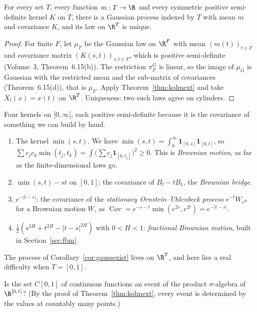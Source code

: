 \begin{corollary}\label{cor:gaussexist}
For every set $T$, every function $m:T\to\R$ and every symmetric positive semi-definite kernel $K$ on $T$, there is a Gaussian process indexed by $T$ with mean $m$ and covariance $K$, and its
law on $\R^T$ is unique.
\end{corollary}

\begin{proof}
For finite $F$, let $\mu_F$ be the Gaussian law on $\R^F$ with mean $(m(t))_{t\in F}$ and covariance matrix $(K(s,t))_{s,t\in F}$, which is positive semi-definite (Volume~3, Theorem~6.15(b)). The restriction
$\pi^G_F$ is linear, so the image of $\mu_G$ is Gaussian with the restricted mean and the sub-matrix of covariances (Theorem~6.15(d)), that is $\mu_F$. Apply Theorem~\ref{thm:kolmext} and take $X_t(x)=x(t)$ on
$\R^T$. Uniqueness: two such laws agree on cylinders.
\end{proof}

\begin{example}\label{ex:kernels}
Four kernels on $[0,\infty[$, each positive semi-definite because it is the covariance of something we can build by hand.
\begin{enumerate}[label=(\alph*)]
\item The kernel $\min(s,t)$. We have $\min(s,t)=\int_0^\infty\mathbf 1_{[0,s]}\mathbf 1_{[0,t]}$, so $\sum c_jc_k\min(t_j,t_k)=\int\bigl(\sum c_j\mathbf 1_{[0,t_j]}\bigr)^2\ge0$. This is \emph{Brownian motion}, as far as the finite-dimensional laws go.
\item $\min(s,t)-st$ on $[0,1]$: the covariance of $B_t-tB_1$, the \emph{Brownian bridge}.
\item $e^{-|t-s|}$: the covariance of the \emph{stationary Ornstein--Uhlenbeck process} $e^{-t}W_{e^{2t}}$ for a Brownian motion $W$, as $\operatorname{Cov}=e^{-s-t}\min(e^{2s},e^{2t})=e^{-|t-s|}$.
\item $\frac12(s^{2H}+t^{2H}-|t-s|^{2H})$ with $0<H<1$: \emph{fractional Brownian motion}, built in Section~\ref{sec:fbm}.
\end{enumerate}
\end{example}

The process of Corollary~\ref{cor:gaussexist} lives on $\R^T$, and here lies a real difficulty when $T=[0,1]$.

\begin{think}
Is the set $C[0,1]$ of continuous functions an event of the product $\sigma$-algebra of $\R^{[0,1]}$? (By the proof of Theorem~\ref{thm:kolmext}, every event is determined by the values at countably
many points.)
\end{think}

